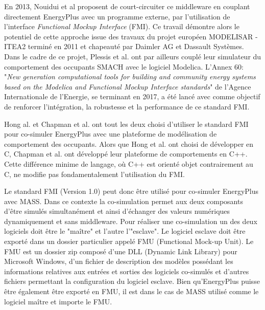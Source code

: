 En 2013, Nouidui et al \cite{Nouidui-13} proposent de court-circuiter ce middleware en couplant directement EnergyPlus avec un programme externe, par l'utilisation de l'interface \textit{Functional Mockup Interface} (FMI). Ce travail démontre alors le potentiel de cette approche issue des travaux du projet européen MODELISAR - ITEA2 terminé en 2011 et chapeauté par Daimler AG et Dassault Systèmes. Dans le cadre de ce projet, Plessis et al. \cite{Plessis-14} ont par ailleurs couplé leur simulateur du comportement des occupants SMACH avec le logiciel Modelica. L'Annex 60: "\textit{New generation computational tools for building and community energy systems based on the Modelica and Functional Mockup Interface standards}" de l'Agence Internationale de l'Energie, se terminant en 2017, a été lancé avec comme objectif de renforcer l'intégration, la robustesse et la performance de ce standard FMI.

Hong al. \cite{Hong-16} et Chapman et al. \cite{Chapman-14} ont tout les deux choisi d'utiliser le standard FMI pour co-simuler EnergyPlus avec une plateforme de modélisation de comportement des occupants. Alors que Hong et al. ont choisi de développer en C, Chapman et al. ont développé leur plateforme de comportements en C++. Cette différence minime de langage, où C++ est orienté objet contrairement au C, ne modifie pas fondamentalement l'utilisation du FMI.

Le standard FMI (Version 1.0) peut donc être utilisé pour co-simuler EnergyPlus avec MASS. Dans ce contexte la co-simulation permet aux deux composants d'être simulés simultanément et ainsi d'échanger des valeurs numériques dynamiquement et sans middleware. Pour réaliser une co-simulation un des deux logiciels doit être le "maître" et l'autre l'"esclave". Le logiciel esclave doit être exporté dans un dossier particulier appelé FMU (Functional Mock-up Unit). Le FMU est un dossier zip composé d'une DLL (Dynamic Link Library) pour Microsoft Windows, d'un fichier de description des modèles possédant les informations relatives aux entrées et sorties des logiciels co-simulés et d'autres fichiers permettant la configuration du logiciel esclave. Bien qu'EnergyPlus puisse être également être exporté en FMU, il est dans le cas de MASS utilisé comme le logiciel maître et importe le FMU. 

